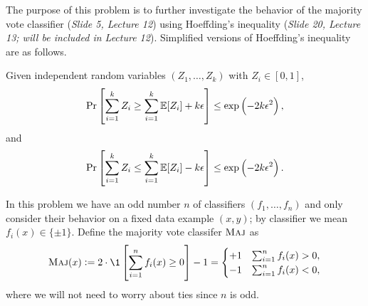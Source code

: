 \begin{enumerate}[font={\Large\bfseries},left=0pt]
\begin{Q}
    
    The purpose of this problem is to further investigate the behavior of the majority vote classifier (\textit{Slide 5, Lecture 12}) using Hoeffding's inequality (\textit{Slide 20, Lecture 13; will be included in Lecture 12}).  Simplified versions of Hoeffding's inequality are as follows.
     \begin{theorem}\label{thm: hoeffding}
       Given independent random variables $(Z_1,\ldots,Z_k)$ with $Z_i \in [0,1]$,
         \begin{equation}\label{eq: hoeffding 1}
           \Pr\sbr{\sum_{i=1}^k Z_i \geq  \sum_{i=1}^k\mathbb{E}[Z_i] + k\eps } \leq \exp\del{-2k\eps^2},
         \end{equation}
         and
         \begin{equation}\label{eq: hoeffding 2}
           \Pr\sbr{\sum_{i=1}^k Z_i \leq  \sum_{i=1}^k\mathbb{E}[Z_i] - k\eps } \leq \exp\del{-2k\eps^2}.
         \end{equation}
     \end{theorem}

     In this problem we have an odd number $n$ of classifiers $(f_1,\ldots,f_n)$
     and only consider their behavior
     on a fixed data example $(x,y)$; by classifier we mean $f_i(x) \in \{\pm 1\}$.
     Define the majority vote classifer $\textsc{Maj}$ as
     \[
       \maj(x)
       := 2\cdot \1\sbr{\sum_{i=1}^n f_i(x) \geq 0 } - 1
       = \begin{cases}
           +1 &\sum_{i=1}^n f_i(x) > 0, \\
           -1 &\sum_{i=1}^n f_i(x) < 0,
         \end{cases}
     \]
     where we will not need to worry about ties since $n$ is odd.


\end{Q}
\end{enumerate}
